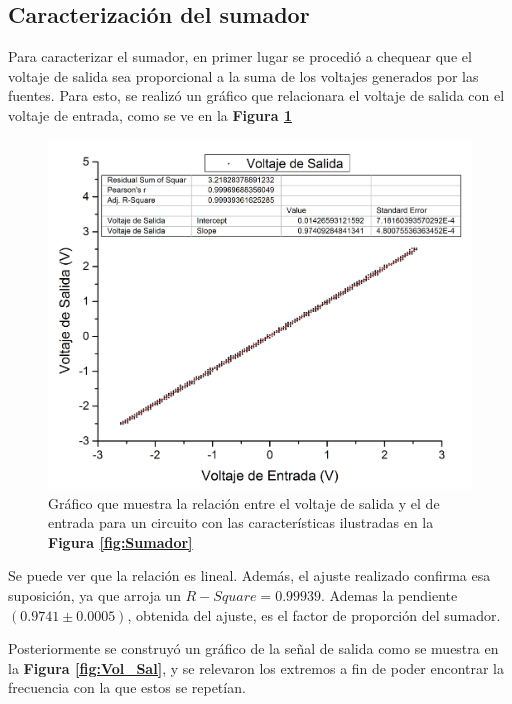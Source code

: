 \documentclass[11pt,a4paper]{article}
\begin{document}
\newpage
\subsection{Caracterización del sumador}

Para caracterizar el sumador, en primer lugar se procedió a chequear que el voltaje de salida sea proporcional a la suma de los voltajes generados por las fuentes. Para esto, se realizó un gráfico que relacionara el voltaje de salida con el voltaje de entrada, como se ve en la \textbf{Figura \ref{fig:S_vs_E}}

\begin{figure}[h]
\centering
\includegraphics[scale=0.4]{Salida_vs_Entrada}
\caption{Gráfico que muestra la relación entre el voltaje de salida y el de entrada para un circuito con las características ilustradas en la \textbf{Figura \ref{fig:Sumador}}}
\label{fig:S_vs_E}
\end{figure}

Se puede ver que la relación es lineal. Además, el ajuste realizado confirma esa suposición, ya que arroja un $R-Square=0.99939$. Ademas la pendiente $(0.9741 \pm 0.0005)$, obtenida del ajuste, es el factor de proporción del sumador. 

Posteriormente se construyó un gráfico de la señal de salida como se muestra en la \textbf{Figura \ref{fig:Vol_Sal}}, y se relevaron los extremos a fin de poder encontrar la frecuencia con la que estos se repetían.
\end{document}
